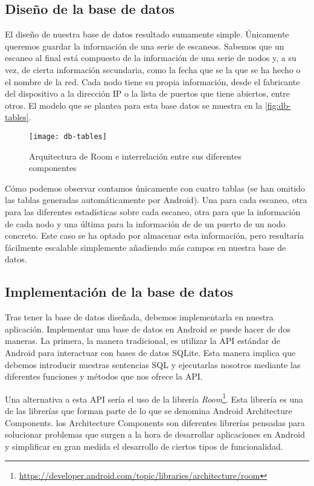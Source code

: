 \subsection{Diseño de la base de datos}

El diseño de nuestra base de datos resultado sumamente simple. Únicamente queremos guardar la información de una serie de escaneos. Sabemos que un escaneo al final está compuesto de la información de una serie de nodos y, a su vez, de cierta información secundaria, como la fecha que se la que se ha hecho o el nombre de la red. Cada nodo tiene su propia información, desde el fabricante del dispositivo a la dirección IP o la lista de puertos que tiene abiertos, entre otros. El modelo que se plantea para esta base datos se muestra en la \autoref{fig:db-tables}.

\begin{figure}[ht]
	\centering
	\texttt{[image: db-tables]}
	\caption{Arquitectura de Room e interrelación entre sus diferentes componentes}
	\label{fig:db-tables}
\end{figure}

Cómo podemos observar contamos únicamente con cuatro tablas (se han omitido las tablas generadas automáticamente por Android). Una para cada escaneo, otra para las diferentes estadísticas sobre cada escaneo, otra para que la información de cada nodo y una última para la información de de un puerto de un nodo concreto. Este caso se ha optado por almacenar esta información, pero resultaría fácilmente escalable simplemente añadiendo más campos en nuestra base de datos.

\subsection{Implementación de la base de datos}

Tras tener la base de datos diseñada, debemos implementarla en nuestra aplicación. Implementar una base de datos en Android se puede hacer de dos maneras. La primera, la manera tradicional, es utilizar la API estándar de Android para interactuar con bases de datos SQLite. Esta manera implica que debemos introducir nuestras sentencias SQL y ejecutarlas nosotros mediante las diferentes funciones y métodos que nos ofrece la API.

Una alternativa a esta API sería el uso de la librería \textit{Room}\footnote{\url{https://developer.android.com/topic/libraries/architecture/room}}. Esta librería es una de las librerías que forman parte de lo que se denomina Android Architecture Components. los Architecture Components son diferentes librerías pensadas para solucionar problemas que surgen a la hora de desarrollar aplicaciones en Android y simplificar en gran medida el desarrollo de ciertos tipos de funcionalidad.

